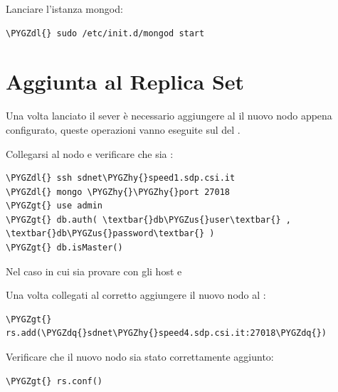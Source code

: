 \documentclass[a4paper,10pt,english]{sphinxmanual}
\def\PYGZus{\char`\_}
\def\PYGZgt{\char`\>}
\def\PYGZdl{\char`\$}
\def\PYGZhy{\char`\-}
\def\PYGZdq{\char`\"}
\begin{document}
Lanciare l'istanza mongod:

\begin{Verbatim}[commandchars=\\\{\}]
\PYGZdl{} sudo /etc/init.d/mongod start
\end{Verbatim}


\section{Aggiunta al Replica Set}
\label{cluster_architecture/add_replica:aggiunta-al-replica-set}
Una volta lanciato il sever è necessario aggiungere al {\hyperref[cluster_architecture/architecture:replica-set]{\emph{}}} il nuovo nodo appena
configurato, queste operazioni vanno eseguite sul {\hyperref[cluster_architecture/architecture:primary]{\emph{}}} del {\hyperref[cluster_architecture/architecture:replica-set]{\emph{}}}.

Collegarsi al nodo  e verificare che sia {\hyperref[cluster_architecture/architecture:primary]{\emph{}}}:

\begin{Verbatim}[commandchars=\\\{\}]
\PYGZdl{} ssh sdnet\PYGZhy{}speed1.sdp.csi.it
\PYGZdl{} mongo \PYGZhy{}\PYGZhy{}port 27018
\PYGZgt{} use admin
\PYGZgt{} db.auth( \textbar{}db\PYGZus{}user\textbar{} , \textbar{}db\PYGZus{}password\textbar{} )
\PYGZgt{} db.isMaster()
\end{Verbatim}

Nel caso in cui sia {\hyperref[cluster_architecture/architecture:secondary]{\emph{}}} provare con gli host  e

Una volta collegati al corretto {\hyperref[cluster_architecture/architecture:primary]{\emph{}}} aggiungere il nuovo nodo al {\hyperref[cluster_architecture/architecture:replica-set]{\emph{}}}:

\begin{Verbatim}[commandchars=\\\{\}]
\PYGZgt{} rs.add(\PYGZdq{}sdnet\PYGZhy{}speed4.sdp.csi.it:27018\PYGZdq{})
\end{Verbatim}

Verificare che il nuovo nodo sia stato correttamente aggiunto:

\begin{Verbatim}[commandchars=\\\{\}]
\PYGZgt{} rs.conf()
\end{Verbatim}
\end{document}
